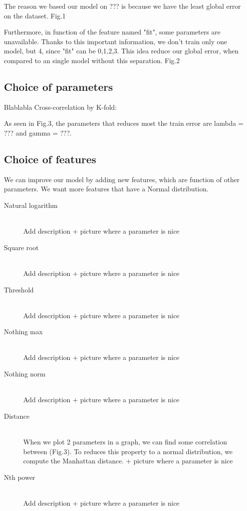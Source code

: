 \documentclass[10pt,conference,compsocconf]{IEEEtran}
\begin{document}
The reason we based our model on ??? is because we have the least global error on the dataset. Fig.1 

Furthermore, in function of the feature named "fit", some parameters are unavailable. Thanks to this important information, we don't train only one model, but 4, since "fit" can be {0,1,2,3}.
This idea reduce our global error, when compared to an single model without this separation. Fig.2

\subsection{Choice of parameters}
Blablabla
Cross-correlation by K-fold:

As seen in Fig.3, the parameters that reduces most the train error are lambda = ??? and gamma = ???.

\subsection{Choice of features}

We can improve our model by adding new features, which are function of other parameters. We want more features that have a Normal distribution. 
\begin{description}
	\item[Natural logarithm] \ \\
	Add description + picture where a parameter is nice
	\item[Square root] \ \\
	Add description + picture where a parameter is nice
	\item[Threshold] \ \\
	Add description + picture where a parameter is nice
	\item[Nothing max] \ \\
	Add description + picture where a parameter is nice
	\item[Nothing norm] \ \\
	Add description + picture where a parameter is nice
	\item[Distance] \ \\
	When we plot 2 parameters in a graph, we can find some correlation between (Fig.3). To reduces this property to a normal distribution, we compute the Manhattan distance. + picture where a parameter is nice
	\item[Nth power] \ \\
	Add description + picture where a parameter is nice
\end{description}
\end{document}
